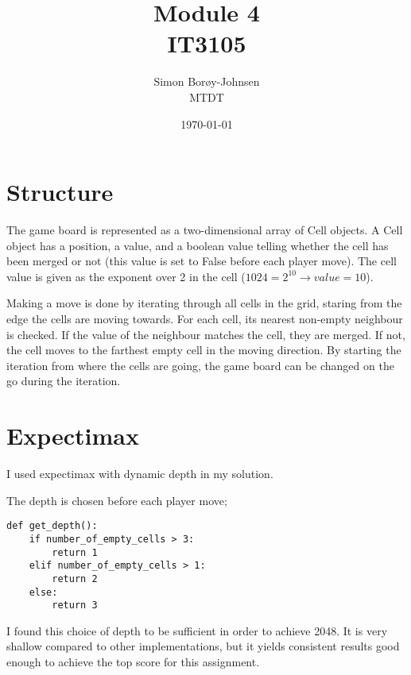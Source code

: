\documentclass{article}
\begin{document}
\title{\textbf{Module 4} \\ IT3105}
\author{Simon Borøy-Johnsen \\ MTDT}
\date{\today}
\maketitle


\section{Structure}
The game board is represented as a two-dimensional array of Cell objects. A Cell object has a position, a value, and a boolean value telling whether the cell has been merged or not (this value is set to False before each player move). The cell value is given as the exponent over 2 in the cell ($1024 = 2^{10} \rightarrow value=10$).

Making a move is done by iterating through all cells in the grid, staring from the edge the cells are moving towards. For each cell, its nearest non-empty neighbour is checked. If the value of the neighbour matches the cell, they are merged. If not, the cell moves to the farthest empty cell in the moving direction. By starting the iteration from where the cells are going, the game board can be changed on the go during the iteration.

\section{Expectimax}
I used expectimax with dynamic depth in my solution.

The depth is chosen before each player move;
\begin{lstlisting}
def get_depth():
    if number_of_empty_cells > 3:
        return 1
    elif number_of_empty_cells > 1:
        return 2
    else:
        return 3
\end{lstlisting}
I found this choice of depth to be sufficient in order to achieve 2048. It is very shallow compared to other implementations, but it yields consistent results good enough to achieve the top score for this assignment.
\end{document}
